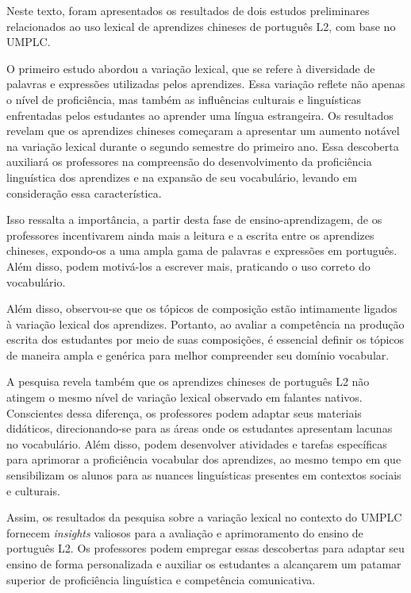 \documentclass[portuguese]{textolivre}
\begin{document}
Neste texto, foram apresentados os resultados de dois estudos preliminares relacionados ao uso lexical de aprendizes chineses de português L2, com base no UMPLC.  

O primeiro estudo abordou a variação lexical, que se refere à diversidade de palavras e expressões utilizadas pelos aprendizes. Essa variação reflete não apenas o nível de proficiência, mas também as influências culturais e linguísticas enfrentadas pelos estudantes ao aprender uma língua estrangeira. Os resultados revelam que os aprendizes chineses começaram a apresentar um aumento notável na variação lexical durante o segundo semestre do primeiro ano. Essa descoberta auxiliará os professores na compreensão do desenvolvimento da proficiência linguística dos aprendizes e na expansão de seu vocabulário, levando em consideração essa característica.

Isso ressalta a importância, a partir desta fase de ensino-aprendizagem, de os professores incentivarem ainda mais a leitura e a escrita entre os aprendizes chineses, expondo-os a uma ampla gama de palavras e expressões em português. Além disso, podem motivá-los a escrever mais, praticando o uso correto do vocabulário.

Além disso, observou-se que os tópicos de composição estão intimamente ligados à variação lexical dos aprendizes. Portanto, ao avaliar a competência na produção escrita dos estudantes por meio de suas composições, é essencial definir os tópicos de maneira ampla e genérica para melhor compreender seu domínio vocabular.

A pesquisa revela também que os aprendizes chineses de português L2 não atingem o mesmo nível de variação lexical observado em falantes nativos. Conscientes dessa diferença, os professores podem adaptar seus materiais didáticos, direcionando-se para as áreas onde os estudantes apresentam lacunas no vocabulário. Além disso, podem desenvolver atividades e tarefas específicas para aprimorar a proficiência vocabular dos aprendizes, ao mesmo tempo em que sensibilizam os alunos para as nuances linguísticas presentes em contextos sociais e culturais.

Assim, os resultados da pesquisa sobre a variação lexical no contexto do UMPLC fornecem \textit{insights} valiosos para a avaliação e aprimoramento do ensino de português L2. Os professores podem empregar essas descobertas para adaptar seu ensino de forma personalizada e auxiliar os estudantes a alcançarem um patamar superior de proficiência linguística e competência comunicativa.
\end{document}
